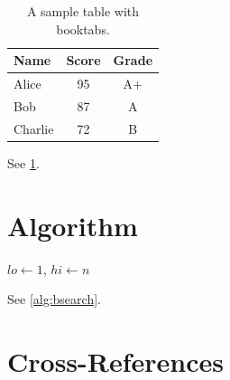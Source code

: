 \documentclass[a4paper,12pt]{article}
\begin{document}
\begin{table}[htbp]
    \centering
    \caption{A sample table with booktabs.}
    \label{tab:sample}
    \begin{tabular}{lcc}
        \toprule
        \textbf{Name} & \textbf{Score} & \textbf{Grade} \\
        \midrule
        Alice         & 95             & A+             \\
        Bob           & 87             & A              \\
        Charlie       & 72             & B              \\
        \bottomrule
    \end{tabular}
\end{table}

See \cref{tab:sample}.

\section{Algorithm}


\begin{algorithm}[H]
    \caption{Binary Search}
    \label{alg:bsearch}
    $lo \gets 1$, $hi \gets n$\;
    \;
\end{algorithm}

See \cref{alg:bsearch}.

\section{Cross-References}
\end{document}
